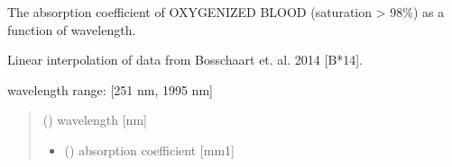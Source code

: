 \documentclass[letterpaper,10pt,english]{sphinxmanual}
\begin{document}
\begin{fulllineitems}
\label{\detokenize{03_absorption_coefficient:skinoptics.absorption_coefficient.mua_oxy_Bosschaart}}
\pysigstartsignatures
{}
\pysigstopsignatures
\begin{DUlineblock}{0em}
\item[] The absorption coefficient of OXYGENIZED BLOOD (saturation \textgreater{} 98\%) as a function of wavelength.
\item[] Linear interpolation of data from Bosschaart et. al. 2014 {[}B*14{]}.
\end{DUlineblock}

\begin{DUlineblock}{0em}
\item[] wavelength range: {[}251 nm, 1995 nm{]}
\end{DUlineblock}
\begin{quote}\begin{description}
\sphinxAtStartPar
{} () \textendash{} wavelength {[}nm{]}

\sphinxAtStartPar
\begin{itemize}
\item {} 
\sphinxAtStartPar
{} () \textendash{} absorption coefficient {[}mm\sphinxhyphen{}1{]}

\end{itemize}


\end{description}\end{quote}

\end{fulllineitems}

\end{document}
